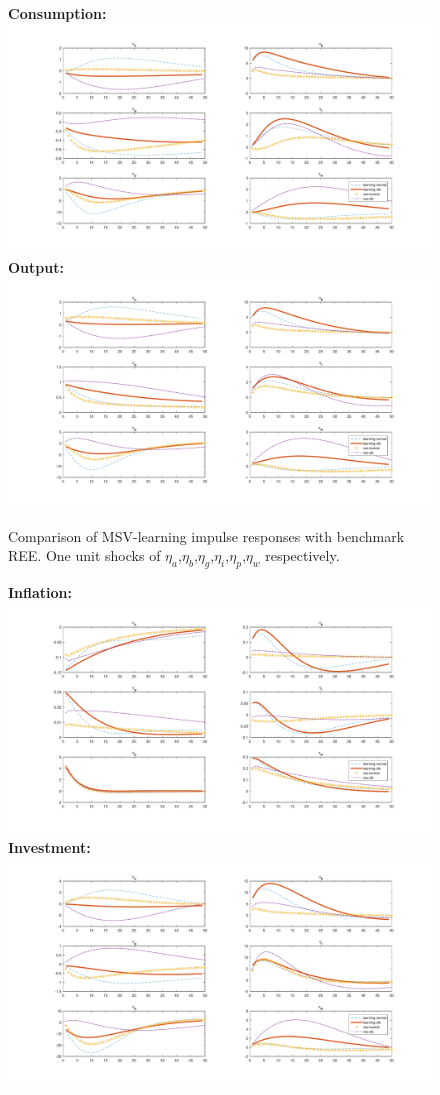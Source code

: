 \documentclass[12pt,reqno]{article}
\numberwithin{equation}{section}
\begin{document}
\begin{figure}[H]
\caption{Comparison of MSV-learning impulse responses with benchmark REE. One unit shocks of $\eta_a$,$\eta_b$,$\eta_g$,$\eta_i$,$\eta_p$,$\eta_w$ respectively.}
\textbf{Consumption:}\\
\includegraphics[scale=0.5]{MSV_impresp_cons_riseComp.pdf}
\textbf{Output:}\\
\includegraphics[scale=0.5]{MSV_impresp_output_riseComp.pdf}
\end{figure}

\begin{figure}[H]
\textbf{Inflation:}\\
\includegraphics[scale=0.5]{MSV_impresp_pinf_riseComp.pdf}
\textbf{Investment:}\\
\includegraphics[scale=0.5]{MSV_impresp_inve_riseComp.pdf}
\end{figure}
\end{document}
